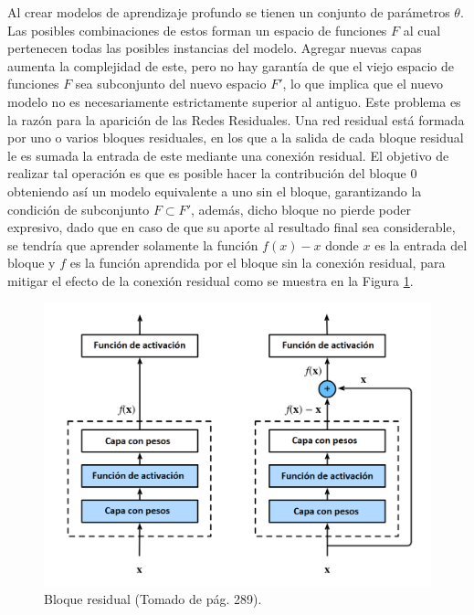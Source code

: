 Al crear modelos de aprendizaje profundo se tienen un conjunto de parámetros $\theta$. Las posibles combinaciones 
de estos forman un espacio de funciones $F$ al cual pertenecen todas las posibles instancias del modelo.
Agregar nuevas capas aumenta la complejidad de este, pero no hay garantía de que el viejo espacio 
de funciones $F$ sea subconjunto del nuevo espacio $F'$, lo que implica que el nuevo modelo no es necesariamente
estrictamente superior al antiguo. Este problema es la razón para la aparición de las Redes Residuales. 
Una red residual está formada por 
uno o varios bloques residuales, en los que a la salida de cada bloque residual le es sumada la entrada de 
este mediante una conexión residual.
El objetivo de realizar tal operación es que es posible hacer la contribución del bloque 0 obteniendo así
un modelo equivalente a uno sin el bloque, garantizando la condición de subconjunto $F \subset F'$, además,
dicho bloque no pierde poder expresivo, dado que en caso de que su aporte al resultado final sea considerable, 
se tendría que aprender solamente la función $f(x) - x$ donde $x$ es la entrada del bloque y $f$ es la función 
aprendida por el bloque sin la conexión residual, para mitigar el efecto de la conexión residual como se muestra
en la Figura \ref{fig:res_block}.

\begin{figure}[h!]
	\begin{center}
		\begin{center}
			\includegraphics[scale=.4]{Graphics/resnet.png}
        \end{center}
	    \caption{Bloque residual (Tomado de \textcite{d2l} pág. 289).}\label{fig:res_block}
	\end{center}
\end{figure}

